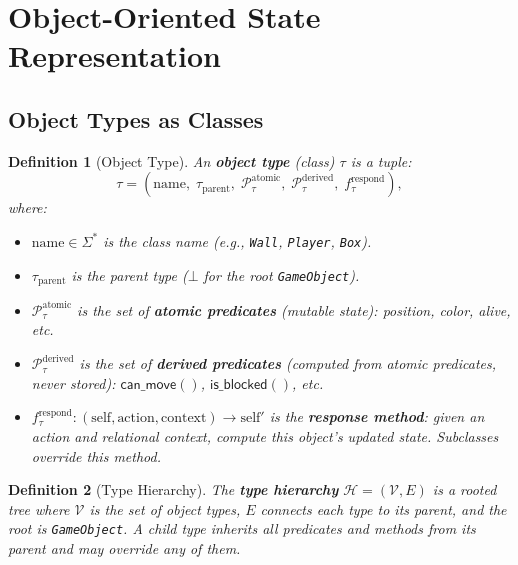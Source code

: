 \documentclass{article}
\newtheorem{definition}{Definition}
\newcommand{\calH}{\mathcal{H}}
\newcommand{\calP}{\mathcal{P}}
\newcommand{\calV}{\mathcal{V}}
\begin{document}

\section{Object-Oriented State Representation}
\label{sec:oop_state}

\subsection{Object Types as Classes}
\label{sec:type_hierarchy}

\begin{definition}[Object Type]
\label{def:object_type}
An \textbf{object type} (class) $\tau$ is a tuple:
\begin{equation}
    \tau = (\text{name}, \; \tau_{\text{parent}}, \;
           \calP_\tau^{\text{atomic}}, \;
           \calP_\tau^{\text{derived}}, \;
           f_\tau^{\text{respond}}),
\end{equation}
where:
\begin{itemize}[nosep]
    \item $\text{name} \in \Sigma^*$ is the class name
          (e.g., \texttt{Wall}, \texttt{Player}, \texttt{Box}).
    \item $\tau_{\text{parent}}$ is the parent type ($\bot$ for the root
          \texttt{GameObject}).
    \item $\calP_\tau^{\text{atomic}}$ is the set of \textbf{atomic predicates}
          (mutable state): position, color, alive, etc.
    \item $\calP_\tau^{\text{derived}}$ is the set of \textbf{derived predicates}
          (computed from atomic predicates, never stored):
          $\mathsf{can\_move}()$, $\mathsf{is\_blocked}()$, etc.
    \item $f_\tau^{\text{respond}} : (\text{self}, \text{action},
          \text{context}) \to \text{self}'$ is the \textbf{response method}:
          given an action and relational context, compute this object's updated
          state.  Subclasses override this method.
\end{itemize}
\end{definition}

\begin{definition}[Type Hierarchy]
\label{def:type_tree}
The \textbf{type hierarchy} $\calH = (\calV, E)$ is a rooted tree where
$\calV$ is the set of object types, $E$ connects each type to its parent, and
the root is \texttt{GameObject}.  A child type inherits all predicates and
methods from its parent and may override any of them.
\end{definition}
\end{document}
